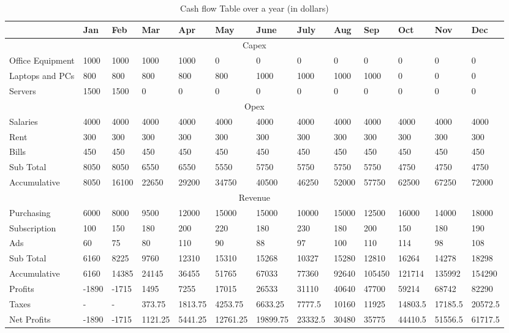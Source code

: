 \begin{table}[H]
\centering
\small
\caption{Cash flow Table over a year (in dollars)}
\begin{adjustbox}{angle=90}
\begin{tabular}[t]{ | l | l | l | l | l | l | l | l | l | l | l | l | l |}
\hline
 & Jan & Feb & Mar & Apr & May & June & July & Aug & Sep & Oct & Nov & Dec \\
\hline
\multicolumn{13}{|c|}{Capex}  \\
\hline
Office Equipment & 1000 & 1000 & 1000 & 1000 & 0 & 0 & 0 & 0 & 0 & 0 & 0 & 0 \\
\hline
Laptops and PCs & 800 & 800 & 800 & 800 & 800 & 1000 & 1000 & 1000 & 1000 & 0 & 0 & 0 \\
\hline
Servers & 1500 & 1500 & 0 & 0 & 0 & 0 & 0 & 0 & 0 & 0 & 0 & 0 \\
\hline
\multicolumn{13}{|c|}{Opex}  \\
\hline
Salaries & 4000 & 4000 & 4000 & 4000 & 4000 & 4000 & 4000 & 4000 & 4000 & 4000 & 4000 & 4000 \\
\hline
Rent & 300 & 300 & 300 & 300 & 300 & 300 & 300 & 300 & 300 & 300 & 300 & 300 \\
\hline
Bills & 450 & 450 & 450 & 450 & 450 & 450 & 450 & 450 & 450 & 450 & 450 & 450 \\
\hline
Sub Total & 8050 & 8050 & 6550 & 6550 & 5550 & 5750 & 5750 & 5750 & 5750 & 4750 & 4750 & 4750 \\
\hline
Accumulative & 8050 & 16100 & 22650 & 29200 & 34750 & 40500 & 46250 & 52000 & 57750 & 62500 & 67250 & 72000 \\
\hline
\multicolumn{13}{|c|}{Revenue}  \\
\hline
Purchasing & 6000 & 8000 & 9500 & 12000 & 15000 & 15000 & 10000 & 15000 & 12500 & 16000 & 14000 & 18000 \\
\hline
Subscription & 100 & 150 & 180 & 200 & 220 & 180 & 230 & 180 & 200 & 150 & 180 & 190 \\
\hline
Ads & 60 & 75 & 80 & 110 & 90 & 88 & 97 & 100 & 110 & 114 & 98 & 108 \\
\hline
Sub Total  & 6160 & 8225 & 9760 & 12310 & 15310 & 15268 & 10327 & 15280 & 12810 & 16264 & 14278 & 18298 \\
\hline
Accumulative & 6160 & 14385 & 24145 & 36455 & 51765 & 67033 & 77360 & 92640 & 105450 & 121714 & 135992 & 154290 \\
\hline
Profits & -1890 & -1715 & 1495 & 7255 & 17015 & 26533 & 31110 & 40640 & 47700 & 59214 & 68742 & 82290  \\
\hline
Taxes & - & - & 373.75 & 1813.75 & 4253.75 & 6633.25 & 7777.5 & 10160 & 11925 & 14803.5 & 17185.5 & 20572.5 \\
\hline
Net Profits & -1890 & -1715 & 1121.25 & 5441.25 & 12761.25 & 19899.75 & 23332.5 & 30480 & 35775 & 44410.5 & 51556.5 & 61717.5 \\
\hline
\end{tabular}
\end{adjustbox}
\label{tab:cash_flow}
\end{table}
